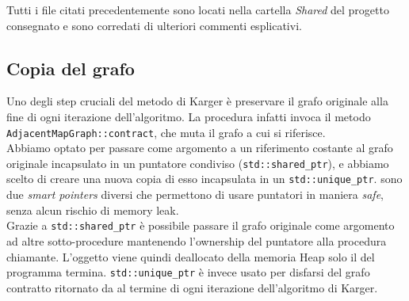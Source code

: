 \noindent Tutti i file citati precedentemente sono locati nella
cartella \textit{Shared} del progetto consegnato e sono corredati di
ulteriori commenti esplicativi.



\newpage

\subsection{Copia del grafo}
\label{sub:graph-copy}

\noindent Uno degli step cruciali del metodo di Karger è preservare il grafo originale alla fine di ogni iterazione dell'algoritmo. La procedura  infatti invoca il metodo \\ \texttt{AdjacentMapGraph::contract}, che muta il grafo a cui si riferisce. \\

\noindent Abbiamo optato per passare come argomento a  un riferimento costante al grafo originale incapsulato in un puntatore condiviso (\texttt{std::shared_ptr}), e abbiamo scelto di creare una nuova copia di esso incapsulata in un \texttt{std::unique_ptr}. sono due \textit{smart pointers} diversi che permettono di usare puntatori in maniera \textit{safe}, senza alcun rischio di memory leak. \\

\noindent Grazie a \texttt{std::shared_ptr} è possibile passare il grafo originale come argomento ad altre sotto-procedure mantenendo l'ownership del puntatore alla procedura chiamante. L'oggetto viene quindi deallocato della memoria Heap solo il  del programma termina. \texttt{std::unique_ptr} è invece usato per disfarsi del grafo contratto ritornato da  al termine di ogni iterazione dell'algoritmo di Karger.

